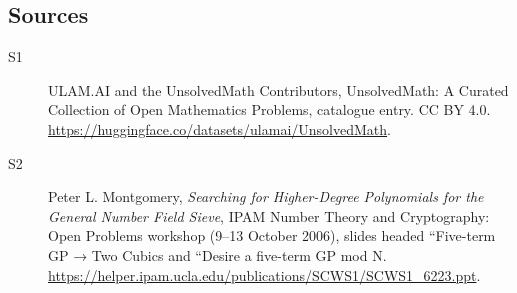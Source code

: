 \documentclass[11pt]{article}
\begin{document}
\subsection{Sources}
\begin{description}
\item[\hypertarget{source:statement:1}{S1}] ULAM.AI and the UnsolvedMath Contributors, UnsolvedMath: A Curated Collection of Open Mathematics Problems, catalogue entry. CC BY 4.0. \url{https://huggingface.co/datasets/ulamai/UnsolvedMath}.
\item[\hypertarget{source:statement:2}{S2}] Peter L. Montgomery, \emph{Searching for Higher-Degree Polynomials for the General Number Field Sieve}, IPAM Number Theory and Cryptography: Open Problems workshop (9--13 October 2006), slides headed ``Five-term GP → Two Cubics and ``Desire a five-term GP mod N. \url{https://helper.ipam.ucla.edu/publications/SCWS1/SCWS1_6223.ppt}.
\end{description}
\label{end:statement}
\end{document}
